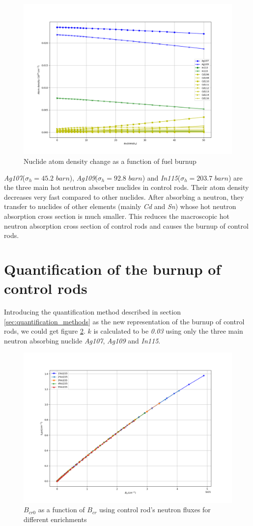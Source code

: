 \begin{figure}[!htb]
    \centering\includegraphics[width=0.7\linewidth]{Figs/Ni_Bu.png}
    \caption{Nuclide atom density change as a function of fuel burnup}
    \label{fig:nuclide_change}
\end{figure}

\textit{Ag107}($\sigma_h = \textit{45.2 barn}$), \textit{Ag109}($\sigma_h = \textit{92.8 barn}$)
and \textit{In115}($\sigma_h = \textit{203.7 barn}$) are the three main hot neutron absorber nuclides in control rods.
Their atom density decreases very fast compared to other nuclides.
After absorbing a neutron, they transfer to nuclides of other elements (mainly \textit{Cd} and \textit{Sn})
whose hot neutron absorption cross section is much smaller.
This reduces the macroscopic hot neutron absorption cross section of control rods
and causes the burnup of control rods.

\section{Quantification of the burnup of control rods}
\label{sec:quantification_results}
Introducing the quantification method described in section \ref{sec:quantification_methods} as the new representation of the burnup of control rods,
we could get figure \ref{fig:bcr0-bcr}.
$k$ is calculated to be \textit{0.03} using only the three main neutron absorbing nuclide \textit{Ag107}, \textit{Ag109}
and \textit{In115}.

\begin{figure}[!htb]
    \centering\includegraphics[width=0.6\linewidth]{Figs/Bcr0_Bcro_difU.png}
    \caption{$B_{cr0}$ as a function of $B_{cr}$ using control rod's neutron fluxes for different enrichments}
    \label{fig:bcr0-bcr}
\end{figure}

